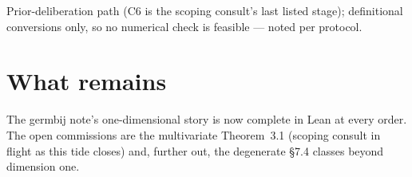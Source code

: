 \documentclass[11pt]{article}
\begin{document}
Prior-deliberation path (C6 is the scoping consult's last listed
stage); definitional conversions only, so no numerical check is
feasible --- noted per protocol.

\section{What remains}

The germbij note's one-dimensional story is now complete in Lean at
every order. The open commissions are the multivariate Theorem~3.1
(scoping consult in flight as this tide closes) and, further out, the
degenerate \S7.4 classes beyond dimension one.
\end{document}
